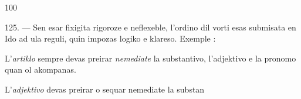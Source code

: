 \begin{VUpage}[104]{100}
\VUsaut{7.01mm}
\VUsaut{4.22mm}

125. --- Sen esar fixigita rigoroze e neflexeble, l'ordino\nl
dil vorti esas submisata en Ido ad ula reguli, quin impozas\nl
logiko e klareso. Exemple :

L'\textit{artiklo} sempre devas preirar \textit{nemediate} la substantivo,\nl
l'adjektivo e la pronomo quan ol akompanas.

L'\textit{adjektivo} devas preirar o sequar nemediate la substan\cc
\end{VUpage}

